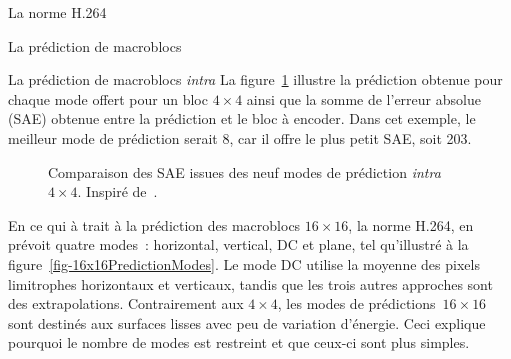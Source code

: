 \documentclass[letterpaper, twoside, 12pt,memoire]{thETS}
\begin{document}
\begin{chapter}{La norme H.264}
\begin{section}{La prédiction de macroblocs}
\begin{subsection}{La prédiction de macroblocs \textit{intra}}
La figure~\ref{fig-SAEPredictionBlocks} illustre la prédiction obtenue pour
chaque mode offert pour un bloc $4 \times 4$ ainsi que la somme de l'erreur
absolue (SAE) obtenue entre la prédiction et le bloc à encoder. Dans cet
exemple, le meilleur mode de prédiction serait 8, car il offre le plus petit
SAE, soit 203.

\begin{figure}[htb]
\caption{Comparaison des SAE issues des neuf modes de prédiction
\textit{intra} $4 \times 4$. Inspiré de~\cite{richardson2003}.}
\label{fig-SAEPredictionBlocks}
\end{figure}

En ce qui à trait à la prédiction des macroblocs $16\times16$, la norme H.264,
en prévoit quatre modes~: horizontal, vertical, DC et plane, tel qu'illustré à
la figure~\ref{fig-16x16PredictionModes}. Le mode DC utilise la moyenne des
pixels limitrophes horizontaux et verticaux, tandis que les trois autres
approches sont des extrapolations. Contrairement aux $4 \times 4$, les modes de
prédictions~$16 \times 16$ sont destinés aux surfaces lisses avec peu de
variation d'énergie. Ceci explique pourquoi le nombre de modes est restreint et
que ceux-ci sont plus simples.


\end{subsection}
\end{section}
\end{chapter}
\end{document}
